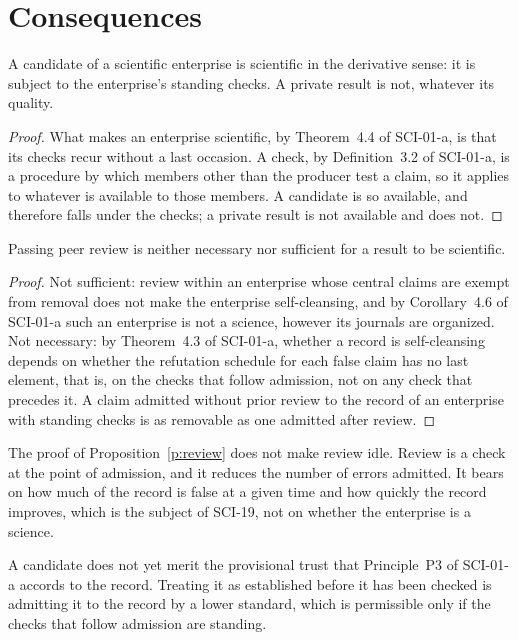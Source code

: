 \documentclass{situationist-preprint}
\begin{document}
\section{Consequences}\label{s:consequences}

\begin{proposition}[Exposure]\label{p:exposure}
A candidate of a scientific enterprise is scientific in the derivative sense: it is subject to the enterprise's standing checks. A private result is not, whatever its quality.
\end{proposition}

\begin{proof}
What makes an enterprise scientific, by Theorem~4.4 of SCI-01-a, is that its checks recur without a last occasion. A check, by Definition~3.2 of SCI-01-a, is a procedure by which members other than the producer test a claim, so it applies to whatever is available to those members. A candidate is so available, and therefore falls under the checks; a private result is not available and does not.
\end{proof}

\begin{proposition}\label{p:review}
Passing peer review is neither necessary nor sufficient for a result to be scientific.
\end{proposition}

\begin{proof}
Not sufficient: review within an enterprise whose central claims are exempt from removal does not make the enterprise self-cleansing, and by Corollary~4.6 of SCI-01-a such an enterprise is not a science, however its journals are organized. Not necessary: by Theorem~4.3 of SCI-01-a, whether a record is self-cleansing depends on whether the refutation schedule for each false claim has no last element, that is, on the checks that follow admission, not on any check that precedes it. A claim admitted without prior review to the record of an enterprise with standing checks is as removable as one admitted after review.
\end{proof}

The proof of Proposition~\ref{p:review} does not make review idle. Review is a check at the point of admission, and it reduces the number of errors admitted. It bears on how much of the record is false at a given time and how quickly the record improves, which is the subject of SCI-19, not on whether the enterprise is a science.

\begin{corollary}[Trust]\label{c:trust}
A candidate does not yet merit the provisional trust that Principle~P3 of SCI-01-a accords to the record. Treating it as established before it has been checked is admitting it to the record by a lower standard, which is permissible only if the checks that follow admission are standing.
\end{corollary}
\end{document}
